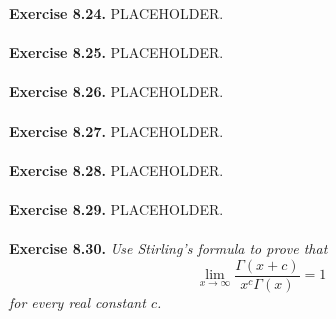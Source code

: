 \documentclass{article}
\begin{document}
\textbf{Exercise 8.24.}
PLACEHOLDER. \\\\






\textbf{Exercise 8.25.}
PLACEHOLDER. \\\\






\textbf{Exercise 8.26.}
PLACEHOLDER. \\\\






\textbf{Exercise 8.27.}
PLACEHOLDER. \\\\






\textbf{Exercise 8.28.}
PLACEHOLDER. \\\\






\textbf{Exercise 8.29.}
PLACEHOLDER. \\\\






\textbf{Exercise 8.30.}
\emph{Use Stirling's formula to prove that
\[
  \lim_{x \to \infty} \frac{\Gamma(x+c)}{x^c \Gamma(x)} = 1
\]
for every real constant $c$.} \\
\end{document}
